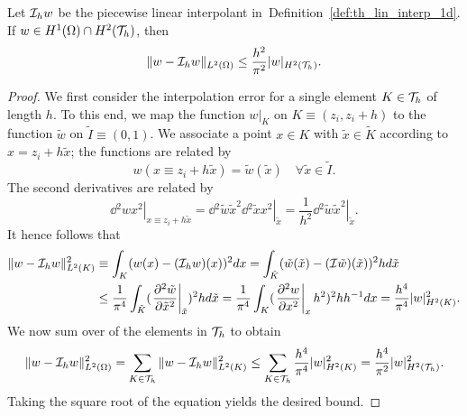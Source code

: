 \begin{proposition}
  \label{prop:th_lin_interp_L2}
  Let $\mathcal{I}_h w$ be the piecewise linear interpolant in~Definition~\ref{def:th_lin_interp_1d}. If $w \in H^1(\Omega) \cap H^2(\mathcal{T}_h)$, then
  \begin{equation*}
    \| w - \mathcal{I}_h w \|_{L^2(\Omega)}
    \leq \frac{h^2}{\pi^2} | w |_{H^2(\mathcal{T}_h)}.
  \end{equation*}
  \begin{proof}
    We first consider the interpolation error for a single element $K \in \mathcal{T}_h$ of length $h$. To this end, we map the function $w|_K$ on $K \equiv (z_i,z_i+h)$ to the function $\tilde w$ on $\tilde I \equiv (0,1)$. We associate a point $x \in K$ with $\tilde x \in \tilde K$ according to $x = z_i + h \tilde x$; the functions are related by
    \begin{equation*}
      w(x \equiv z_i + h \tilde x) = \tilde w(\tilde x) \quad \forall \tilde x \in \tilde I.
    \end{equation*}
    The second derivatives are related by
    \begin{equation*}
      \left. \dd{^2 w}{x^2} \right|_{x \equiv z_i + h \tilde x}
      = \left. \dd{^2 \tilde w}{\tilde x^2} \dd{^2 \tilde x}{x^2} \right|_{\tilde x}
      = \frac{1}{h^2} \left. \dd{^2 \tilde w}{\tilde x^2} \right|_{\tilde x}.
    \end{equation*}
    It hence follows that
    \begin{align*}
      \| w - \mathcal{I}_h w \|_{L^2(K)}^2
      &\equiv
      \int_{K} ( w(x) - (\mathcal{I}_h w)(x) )^2 dx
      =
      \int_{\tilde K} (\tilde w(\tilde x) - (\mathcal{I} \tilde w)(\tilde x))^2 h d \tilde x
      \\
      &\leq
      \frac{1}{\pi^4} \int_{\tilde K} (\left. \frac{\partial ^2\tilde w}{\partial \tilde x^2} \right|_{\tilde x})^2 h d \tilde x
      =
      \frac{1}{\pi^4} \int_{K} (\left. \frac{\partial ^2 w}{\partial x^2} \right|_x h^2 )^2 h h^{-1} d x
      = \frac{h^4}{\pi^4} | w |_{H^2(K)}^2.
    \end{align*}
    We now sum over of the elements in $\mathcal{T}_h$ to obtain
    \begin{equation*}
      \| w - \mathcal{I}_h w \|_{L^2(\Omega)}^2
      =
      \sum_{K \in \mathcal{T}_h} \| w - \mathcal{I}_h w \|_{L^2(K)}^2
      \leq
      \sum_{K \in \mathcal{T}_h} \frac{h^4}{\pi^4} | w |^2_{H^2(K)}
      = \frac{h^4}{\pi^2} | w |^2_{H^2(\mathcal{T}_h)}.
    \end{equation*}
    Taking the square root of the equation yields the desired bound.
  \end{proof}
\end{proposition}
